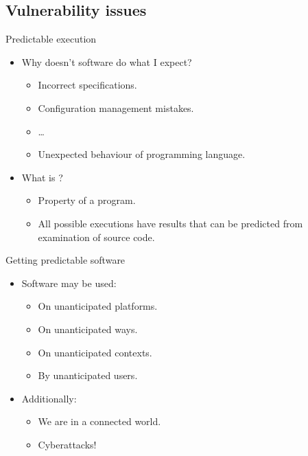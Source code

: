 \subsection{Vulnerability issues}

\begin{frame}[t]{Predictable execution}
\begin{itemize}
  \item Why doesn't software do what I expect?
    \begin{itemize}
      \item Incorrect specifications.
      \item Configuration management mistakes.
      \item \ldots
      \item Unexpected behaviour of programming language.
    \end{itemize}

  \vfill\pause
  \item What is ?
    \begin{itemize}
      \item Property of a program.
      \item All possible executions have results that can be predicted from examination 
            of source code.
    \end{itemize}
\end{itemize}
\end{frame}

\begin{frame}[t]{Getting predictable software}
\begin{itemize}
  \item Software may be used:
    \begin{itemize}
      \item On unanticipated platforms.
      \item On unanticipated ways.
      \item On unanticipated contexts.
      \item By unanticipated users.
    \end{itemize}

  \vfill
  \item Additionally:
    \begin{itemize}
      \item We are in a connected world.
      \item Cyberattacks!
    \end{itemize}
\end{itemize}
\end{frame}

